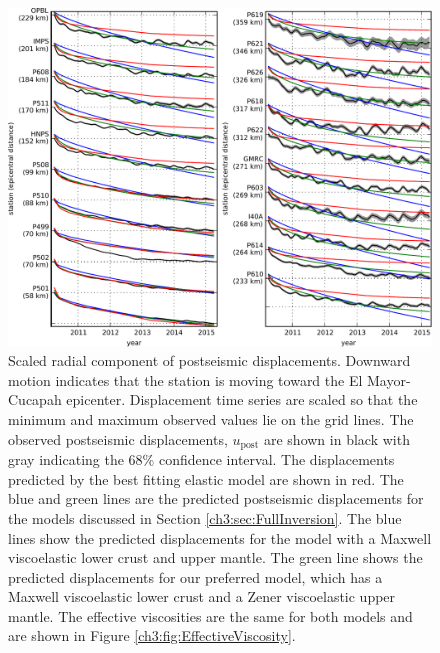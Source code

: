 \begin{figure}
\includegraphics[scale=1.0]{ch3/figures/2016jb013114-p07}
\caption{Scaled radial component of postseismic displacements.
Downward motion indicates that the station is moving toward the El
Mayor-Cucapah epicenter.  Displacement time series are scaled so that
the minimum and maximum observed values lie on the grid lines.  The
observed postseismic displacements, $u_\mathrm{post}$ are shown in
black with gray indicating the 68\% confidence interval.  The
displacements predicted by the best fitting elastic model are shown in
red.  The blue and green lines are the predicted postseismic
displacements for the models discussed in Section
\ref{ch3:sec:FullInversion}. The blue lines show the predicted
displacements for the model with a Maxwell viscoelastic lower crust
and upper mantle.  The green line shows the predicted displacements
for our preferred model, which has a Maxwell viscoelastic lower crust
and a Zener viscoelastic upper mantle.  The effective viscosities are
the same for both models and are shown in Figure
\ref{ch3:fig:EffectiveViscosity}.}
\label{ch3:fig:RecordSectionMain}
\end{figure}

